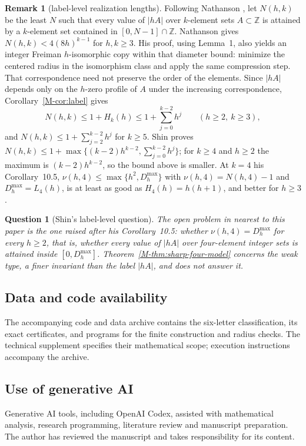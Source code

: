 \documentclass[11pt,reqno]{amsart}
\theoremstyle{plain}
\newtheorem{question}[theorem]{Question}
\theoremstyle{definition}
\newtheorem{remark}[theorem]{Remark}
\theoremstyle{plain}
\newcommand{\Z}{\mathbb{Z}}
\theoremstyle{plain}
\theoremstyle{plain}
\theoremstyle{plain}
\theoremstyle{plain}
\theoremstyle{plain}
\theoremstyle{definition}
\theoremstyle{definition}
\theoremstyle{definition}
\theoremstyle{plain}
\begin{document}
\begin{remark}[label-level realization lengths]\label{M-rem:label-length}
Following Nathanson \cite{M-Nat26}, let $N(h,k)$ be the least $N$ such that
every value of $|hA|$ over $k$-element sets $A\subset\Z$ is attained by a
$k$-element set contained in $[0,N-1]\cap\Z$.
Nathanson \cite[Theorem~8]{M-Nat26} gives $N(h,k)<4(8h)^{k-1}$ for
$h,k\ge3$. His proof, using Lemma~1, also yields an integer Freiman
$h$-isomorphic copy within that diameter bound: minimize the centered
radius in the isomorphism class and apply the same compression step.
That correspondence need not preserve the order of the elements.
 Since $|hA|$ depends only on
the $h$-zero profile of $A$ under the increasing correspondence,
Corollary~\ref{M-cor:label} gives
\[
 N(h,k)\le1+H_k(h)\le1+\sum_{j=0}^{k-2}h^j\qquad(h\ge2,\ k\ge3),
\]
and $N(h,k)\le1+\sum_{j=2}^{k-2}h^j$ for $k\ge5$. Shin
\cite[Theorem~1.5(ii), Corollary~7.4]{M-Shin26} proves
$N(h,k)\le1+\max\{(k-2)h^{k-2},\sum_{j=0}^{k-2}h^j\}$; for $k\ge4$ and
$h\ge2$ the maximum is $(k-2)h^{k-2}$, so the bound above is smaller. At
$k=4$ his Corollary~10.5, $\nu(h,4)\le\max\{h^2,D_h^{\max}\}$ with
$\nu(h,4)=N(h,4)-1$ and $D_h^{\max}=L_4(h)$, is at least as good as
$H_4(h)=h(h+1)$, and better for $h\ge3$.
\end{remark}

\begin{question}[Shin's label-level question]\label{M-q:shin-label}
The open problem in \cite{M-Shin26} nearest to this paper is the one raised
after his Corollary~10.5: whether $\nu(h,4)=D_h^{\max}$ for every $h\ge2$,
that is, whether every value of $|hA|$ over four-element integer sets is
attained inside $[0,D_h^{\max}]$. Theorem~\ref{M-thm:sharp-four-model}
concerns the weak type, a finer invariant than the label $|hA|$, and does
not answer it.
\end{question}


\subsection*{Data and code availability}
The accompanying code and data archive contains the six-letter classification,
its exact certificates, and programs for the finite construction and radius
checks. The technical supplement specifies their mathematical scope; execution
instructions accompany the archive.

\subsection*{Use of generative AI}
Generative AI tools, including OpenAI Codex, assisted with mathematical
analysis, research programming, literature review and manuscript preparation.
The author has reviewed the manuscript and takes responsibility for its content.
\end{document}
